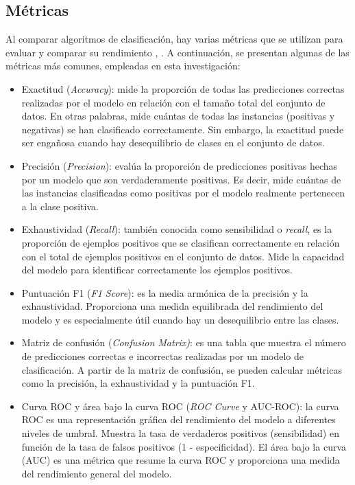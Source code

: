 \subsection{Métricas}
Al comparar algoritmos de clasificación, hay varias métricas que se utilizan para evaluar y comparar su rendimiento \citep{geron2022hands}, \citep{hastie2009elements}. A continuación, se presentan algunas de las métricas más comunes, empleadas en esta investigación:
\begin{itemize}
	\item Exactitud (\textit{Accuracy}): mide la proporción de todas las predicciones correctas realizadas por el modelo en relación con el tamaño total del conjunto de datos. En otras palabras, mide cuántas de todas las instancias (positivas y negativas) se han clasificado correctamente. Sin embargo, la exactitud puede ser engañosa cuando hay desequilibrio de clases en el conjunto de datos.
	\item Precisión (\textit{Precision}): evalúa la proporción de predicciones positivas hechas por un modelo que son verdaderamente positivas. Es decir, mide cuántas de las instancias clasificadas como positivas por el modelo realmente pertenecen a la clase positiva. 
	\item Exhaustividad (\textit{Recall}): también conocida como sensibilidad o \textit{recall}, es la proporción de ejemplos positivos que se clasifican correctamente en relación con el total de ejemplos positivos en el conjunto de datos. Mide la capacidad del modelo para identificar correctamente los ejemplos positivos.
	\item Puntuación F1 (\textit{F1 Score}): es la media armónica de la precisión y la exhaustividad. Proporciona una medida equilibrada del rendimiento del modelo y es especialmente útil cuando hay un desequilibrio entre las clases.
	\item Matriz de confusión (\textit{Confusion Matrix)}: es una tabla que muestra el número de predicciones correctas e incorrectas realizadas por un modelo de clasificación. A partir de la matriz de confusión, se pueden calcular métricas como la precisión, la exhaustividad y la puntuación F1.
	\item Curva ROC y área bajo la curva ROC (\textit{ROC Curve} y AUC-ROC): la curva ROC es una representación gráfica del rendimiento del modelo a diferentes niveles de umbral. Muestra la tasa de verdaderos positivos (sensibilidad) en función de la tasa de falsos positivos (1 - especificidad). El área bajo la curva (AUC) es una métrica que resume la curva ROC y proporciona una medida del rendimiento general del modelo.
\end{itemize}

